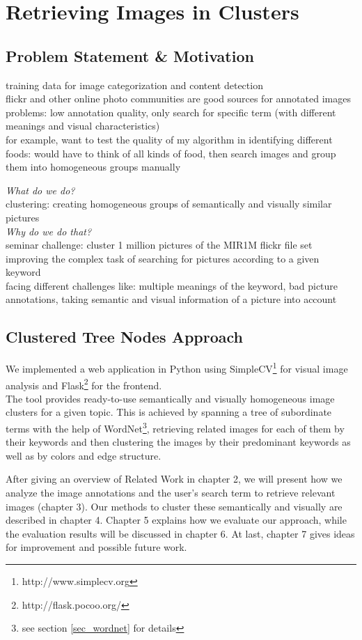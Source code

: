 \section{Retrieving Images in Clusters}
\label{sec_introduction}


\subsection{Problem Statement \& Motivation}
training data for image categorization and content detection \\
flickr and other online photo communities are good sources for annotated images \\
problems: low annotation quality, only search for specific term (with different meanings and visual characteristics) \\
for example, want to test the quality of my algorithm in identifying different foods: would have to think of all kinds of food, then search images and group them into homogeneous groups manually

\bigskip

\emph{What do we do?} \\
clustering: creating homogeneous groups of semantically and visually similar pictures \\

\emph{Why do we do that?} \\
seminar challenge: cluster 1 million pictures of the MIR1M flickr file set \\
improving the complex task of searching for pictures according to a given keyword \\
facing different challenges like: multiple meanings of the keyword, bad picture annotations, taking semantic and visual information of a picture into account \\

\subsection{Clustered Tree Nodes Approach}
We implemented a web application in Python using SimpleCV\footnote{http://www.simplecv.org} for visual image analysis and Flask\footnote{http://flask.pocoo.org/} for the frontend.\\
The tool provides ready-to-use semantically and visually homogeneous image clusters for a given topic. This is achieved by spanning a tree of subordinate terms with the help of WordNet\footnote{see section \ref{sec_wordnet} for details}, retrieving related images for each of them by their keywords  and then clustering the images by their predominant keywords as well as by colors and edge structure.

\bigskip

After giving an overview of Related Work in chapter 2, we will present how we analyze the image annotations and the user's search term to retrieve relevant images (chapter 3). Our methods to cluster these semantically and visually are described in chapter 4. Chapter 5 explains how we evaluate our approach, while the evaluation results will be discussed in chapter 6. At last, chapter 7 gives ideas for improvement and possible future work.
